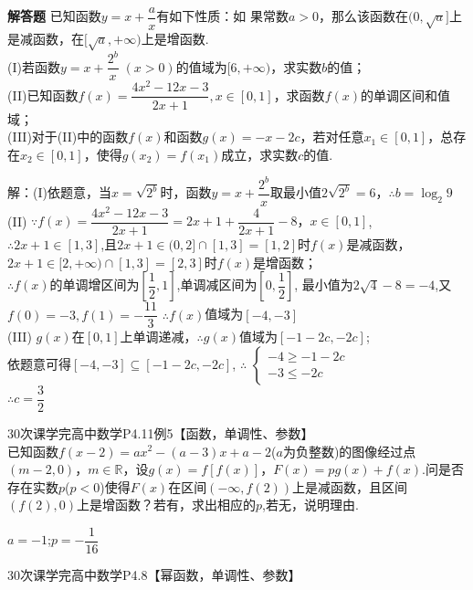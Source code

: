 \begin{exercise}{\bf 解答题}
      已知函数$y=x+\dfrac{a}x$有如下性质：如 果常数$a>0$，那么该函数在$(0,\sqrt a]$上是减函数，在$[\sqrt a,+\infty)$上是增函数.\\
      (I)若函数$y=x+\dfrac{2^b}x\;(x>0)$的值域为$[6,+\infty)$，求实数$b$的值；\\
      (II)已知函数$f(x)=\dfrac{4x^2-12x-3}{2x+1},x\in[0,1]$，求函数$f(x)$的单调区间和值域；\\
      (III)对于(II)中的函数$f(x)$和函数$g(x)=-x-2c$，若对任意$x_1\in[0,1]$，总存在$x_2\in[0,1]$，使得$g(x_2)=f(x_1)$成立，求实数$c$的值.\\
      \begin{answer}
        解：(I)依题意，当$x=\sqrt{2^b}$时，函数$y=x+\dfrac{2^b}x$取最小值$2\sqrt{2^b}=6$，$\therefore b=\log_2 9$\\
        (II) $\because f(x)=\dfrac{4x^2-12x-3}{2x+1}=2x+1+\dfrac{4}{2x+1}-8，x\in [0,1]$, \\
        $\therefore 2x+1\in[1,3]$,且$2x+1\in(0,2]\cap [1,3]=[1,2]$时$f(x)$是减函数，$2x+1\in[2,+\infty)\cap [1,3]=[2,3]$时$f(x)$是增函数；\\
        $\therefore$$f(x)$的单调增区间为$[\dfrac12,1]$,单调减区间为$[0,\dfrac12]$,
        最小值为$2\sqrt4-8=-4$,又$f(0)=-3,f(1)=-\dfrac{11}3$
        $\therefore f(x)$值域为$[-4,-3]$\\
        (III) $g(x)$在$[0,1]$上单调递减，$\therefore g(x)$值域为$[-1-2c,-2c]$;\\
        依题意可得$[-4,-3]\subseteq[-1-2c,-2c]$,
        $\therefore$
        $\begin{cases}
          -4\geq -1-2c\\
          -3\leq -2c
        \end{cases}$\\
        $\therefore c=\dfrac32$
      \end{answer}
    \item 30次课学完高中数学P4.11例5【函数，单调性、参数】\\
      已知函数$f(x-2)=ax^2-(a-3)x+a-2$($a$为负整数)的图像经过点 $(m-2,0) $，$m\in \mathbb{R}$，设$g(x)=f[f(x)] $，$F(x)=pg(x)+f(x) $.问是否存在实数$p$($p<0$)使得$F(x)$在区间$(-\infty,f(2)) $上是减函数，且区间$(f(2),0) $上是增函数？若有，求出相应的$p$,若无，说明理由.\\
      \begin{answer}
        $a=-1$;$p=-\dfrac{1}{16}$
      \end{answer}
    \item 30次课学完高中数学P4.8【幂函数，单调性、参数】\\

\end{exercise}
